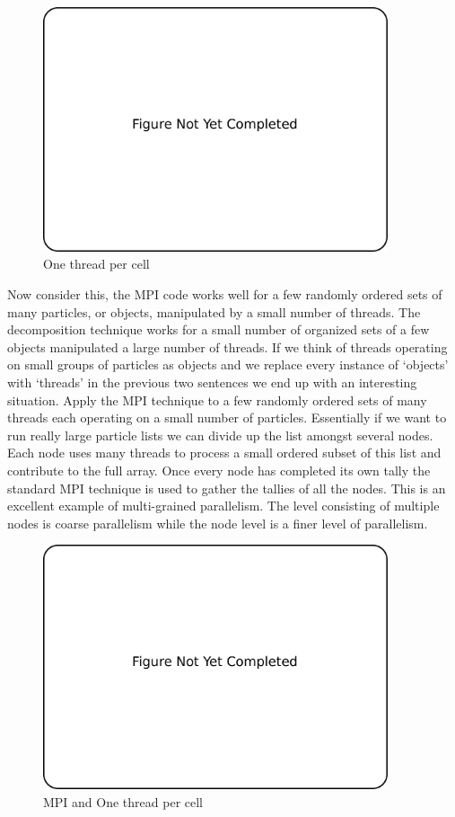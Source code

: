 \begin{figure}
\begin{center}
\includegraphics[width=4in]{introduction/not_finished.pdf}
\end{center}
\caption{One thread per cell}
\label{fig:pic_flowchart_parallel}
\end{figure}

Now consider this, the MPI code works well for a few randomly ordered sets of many particles, or objects, manipulated by a small number of threads. The decomposition technique works for a small number of organized sets of a few objects manipulated a large number of threads. If we think of threads operating on small groups of particles as objects and we replace every instance of `objects' with `threads' in the previous two sentences we end up with an interesting situation. Apply the MPI technique to a few randomly ordered sets of many threads each operating on a small number of particles. Essentially if we want to run really large particle lists we can divide up the list amongst several nodes. Each node uses many threads to process a small ordered subset of this list and contribute to the full array. Once every node has completed its own tally the standard MPI technique is used to gather the tallies of all the nodes. This is an excellent example of multi-grained parallelism. The level consisting of multiple nodes is coarse parallelism while the node level is a finer level of parallelism.   

\begin{figure}
\begin{center}
\includegraphics[width=4in]{introduction/not_finished.pdf}
\end{center}
\caption{MPI and One thread per cell}
\label{fig:pic_flowchart_parallel}
\end{figure}

